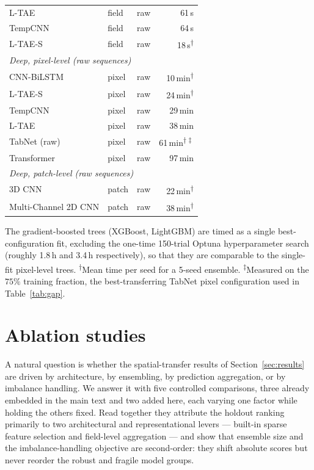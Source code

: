 \documentclass[pdflatex,sn-mathphys]{sn-jnl} %
\begin{document}
\begin{table}[htbp]
\begin{tabular}{lllr}
L-TAE                  & field & raw & 61\,s \\
TempCNN                & field & raw & 64\,s \\
L-TAE-S                & field & raw & 18\,s\textsuperscript{$\dagger$} \\
\midrule
\multicolumn{4}{l}{\emph{Deep, pixel-level (raw sequences)}}\\
CNN-BiLSTM             & pixel & raw & 10\,min\textsuperscript{$\dagger$} \\
L-TAE-S                & pixel & raw & 24\,min\textsuperscript{$\dagger$} \\
TempCNN                & pixel & raw & 29\,min \\
L-TAE                  & pixel & raw & 38\,min \\
TabNet (raw)           & pixel & raw & 61\,min\textsuperscript{$\dagger\ddagger$} \\
Transformer            & pixel & raw & 97\,min \\
\midrule
\multicolumn{4}{l}{\emph{Deep, patch-level (raw sequences)}}\\
3D CNN                 & patch & raw & 22\,min\textsuperscript{$\dagger$} \\
Multi-Channel 2D CNN   & patch & raw & 38\,min\textsuperscript{$\dagger$} \\
\bottomrule
\end{tabular}

\par\vspace{4pt}
{\footnotesize The gradient-boosted trees (XGBoost, LightGBM) are timed as a single
best-configuration fit, excluding the one-time 150-trial Optuna hyperparameter search
(roughly 1.8\,h and 3.4\,h respectively), so that they are comparable to the
single-fit pixel-level trees. \textsuperscript{$\dagger$}Mean time per seed for a
5-seed ensemble. \textsuperscript{$\ddagger$}Measured on the $75\%$ training fraction,
the best-transferring TabNet pixel configuration used in Table~\ref{tab:gap}.\par}
\end{table}

\clearpage

\section{Ablation studies}
\label{app:ablations}

A natural question is whether the spatial-transfer results of
Section~\ref{sec:results} are driven by architecture, by ensembling, by
prediction aggregation, or by imbalance handling. We answer it with five
controlled comparisons, three already embedded in the main text and two added
here, each varying one factor while holding the others fixed. Read together they
attribute the holdout ranking primarily to two architectural and representational
levers --- built-in sparse feature selection and field-level aggregation --- and
show that ensemble size and the imbalance-handling objective are second-order:
they shift absolute scores but never reorder the robust and fragile model groups.
\end{document}
